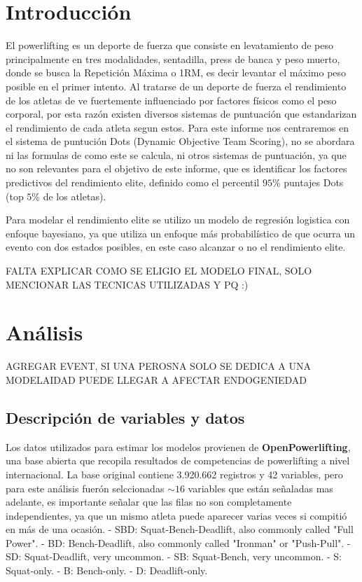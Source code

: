 \documentclass[letter]{article}
\begin{document}
\section*{Introducción}
El powerlifting es un deporte de fuerza que consiste en levatamiento de peso principalmente en tres modalidades, sentadilla, press de banca y peso muerto, donde se 
busca la Repetición Máxima o 1RM, es decir levantar el máximo peso posible en el primer intento. Al tratarse de un deporte de fuerza el rendimiento de los atletas de ve 
fuertemente influenciado por factores físicos como el peso corporal, por esta razón existen diversos sistemas de puntuación que estandarizan el rendimiento de cada atleta
segun estos. Para este informe nos centraremos en el sistema de puntución Dots (Dynamic Objective Team Scoring), no se abordara ni las formulas de como este se calcula, ni 
otros sistemas de puntuación, ya que no son relevantes para el objetivo de este informe, que es identificar los factores predictivos del rendimiento elite, 
definido como el percentil $95\%$ puntajes Dots (top $5\%$ de los atletas). 

Para modelar el rendimiento elite se utilizo un modelo de regresión logistica con enfoque bayesiano, ya que utiliza un enfoque más probabilístico de que ocurra un evento 
con dos estados posibles, en este caso alcanzar o no el rendimiento elite. 

FALTA EXPLICAR COMO SE ELIGIO EL MODELO FINAL, SOLO MENCIONAR LAS TECNICAS UTILIZADAS Y PQ :) 

\section*{Análisis}


AGREGAR EVENT, SI UNA PEROSNA SOLO SE DEDICA A UNA MODELAIDAD PUEDE LLEGAR A AFECTAR 
ENDOGENIEDAD 

\subsection*{Descripción de variables y datos}

Los datos utilizados para estimar los modelos provienen de \textbf{OpenPowerlifting}, una base abierta que recopila resultados de competencias de powerlifting a nivel internacional. 
La base original contiene 3.920.662 registros y 42 variables, pero para este análisis fuerón selccionadas $\sim 16$ variables que están señaladas mas adelante, es importante señalar 
que las filas no son completamente independientes, ya que un mismo atleta puede aparecer varias veces si compitió en más de una ocasión.
- SBD: Squat-Bench-Deadlift, also commonly called "Full Power".
- BD: Bench-Deadlift, also commonly called "Ironman" or "Push-Pull".
- SD: Squat-Deadlift, very uncommon.
- SB: Squat-Bench, very uncommon.
- S: Squat-only.
- B: Bench-only.
- D: Deadlift-only.
\end{document}
